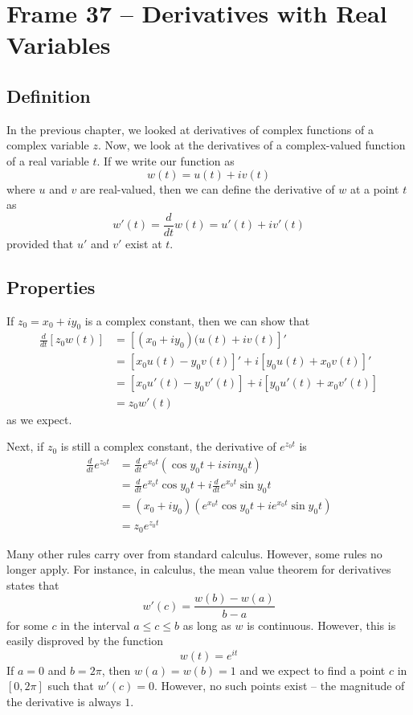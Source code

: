 \documentclass{article}
\begin{document}
\section{Frame 37 -- Derivatives with Real Variables}
\subsection{Definition}
In the previous chapter, we looked at derivatives of complex functions of a complex variable $z$. Now, we look at the derivatives of a complex-valued function of a real variable $t$. If we write our function as
\[
	w(t) = u(t) + iv(t)
\]
where $u$ and $v$ are real-valued, then we can define the derivative of $w$ at a point $t$ as
\[
	w'(t) = \frac{d}{dt} w(t) = u'(t) + iv'(t)
\]
provided that $u'$ and $v'$ exist at $t$.

\subsection{Properties}
If $z_0 = x_0 + iy_0$ is a complex constant, then we can show that
\begin{align*}
	\frac{d}{dt} [z_0 w(t)]
	&= [(x_0 + iy_0)(u(t) + iv(t)]' \\
	&= [x_0 u(t) - y_0 v(t)]' + i[y_0 u(t) + x_0 v(t)]' \\
	&= [x_0 u'(t) - y_0 v'(t)] + i[y_0 u'(t) + x_0 v'(t)] \\
	&= z_0 w'(t)
\end{align*}
as we expect.

Next, if $z_0$ is still a complex constant, the derivative of $e^{z_0 t}$ is
\begin{align*}
	\frac{d}{dt} e^{z_0 t} 
	&= \frac{d}{dt} e^{x_0 t}(\cos y_0 t + i sin y_0 t) \\
	&= \frac{d}{dt} e^{x_0 t} \cos y_0 t + i \frac{d}{dt} e^{x_0 t} \sin y_0 t \\
	&= (x_0 + iy_0)(e^{x_0 t} \cos y_0 t + ie^{x_0 t} \sin y_0 t) \\
	&= z_0 e^{z_0 t}
\end{align*}

Many other rules carry over from standard calculus. However, some rules no longer apply. For instance, in calculus, the mean value theorem for derivatives states that
\[
	w'(c) = \frac{w(b) - w(a)}{b - a}
\]
for some $c$ in the interval $a \le c \le b$ as long as $w$ is continuous. However, this is easily disproved by the function
\[
	w(t) = e^{it}
\]
If $a = 0$ and $b = 2\pi$, then $w(a) = w(b) = 1$ and we expect to find a point $c$ in $[0, 2\pi]$ such that $w'(c) = 0$. However, no such points exist -- the magnitude of the derivative is always $1$.
\end{document}
